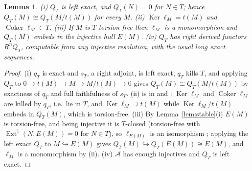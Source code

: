 \documentclass[11pt]{amsart}
\newtheorem{lem}[thm]{Lemma}
\theoremstyle{definition}
\begin{document}
\begin{lem}\label{lem:loc}
(i) $Q_T$ is left exact, and $Q_T(N)=0$ for $N\in T$; hence $Q_T(M)\cong
Q_T(M/t(M))$ for every $M$. (ii) $\operatorname{Ker}\ell_M=t(M)$ and
$\operatorname{Coker}\ell_M\in T$. (iii) If $M$ is $T$-torsion-free then
$\ell_M$ is a monomorphism and $Q_T(M)$ embeds in the injective hull $E(M)$.
(iv) $Q_T$ has right derived functors $R^nQ_T$, computable from any
injective resolution, with the usual long exact sequences.
\end{lem}
\begin{proof}
(i) $q_T$ is exact and $s_T$, a right adjoint, is left exact; $q_T$ kills
$T$, and applying $Q_T$ to $0\to t(M)\to M\to M/t(M)\to0$ gives
$Q_T(M)\cong Q_T(M/t(M))$ by exactness of $q_T$ and full faithfulness of
$s_T$. (ii) is in \cite[Ch.~III]{Gabriel} and \cite[Ch.~IX,
\S1]{Stenstrom}: $\operatorname{Ker}\ell_M$ and $\operatorname{Coker}\ell_M$
are killed by $q_T$, i.e.\ lie in $T$, and $\operatorname{Ker}\ell_M\supseteq
t(M)$ while $\operatorname{Ker}\ell_M/t(M)$ embeds in $Q_T(M)$, which is
torsion-free. (iii) By Lemma~\ref{lem:stable}(i) $E(M)$ is torsion-free,
and being injective it is $T$-closed (torsion-free with
$\operatorname{Ext}^1(N,E(M))=0$ for $N\in T$), so $\ell_{E(M)}$ is an
isomorphism \cite[Ch.~IX, \S1]{Stenstrom}; applying the left exact $Q_T$ to
$M\hookrightarrow E(M)$ gives $Q_T(M)\hookrightarrow Q_T(E(M))\cong E(M)$,
and $\ell_M$ is a monomorphism by (ii). (iv) $\mathcal A$ has enough
injectives and $Q_T$ is left exact.
\end{proof}
\end{document}

